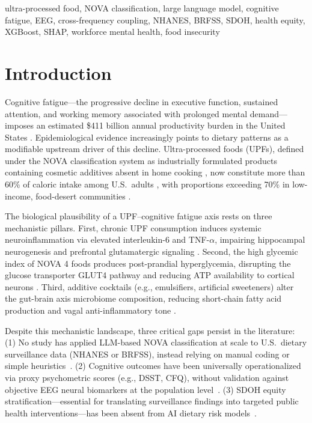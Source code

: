 \documentclass[journal]{IEEEtran}
\begin{document}
\begin{IEEEkeywords}
ultra-processed food, NOVA classification, large language model, cognitive
fatigue, EEG, cross-frequency coupling, NHANES, BRFSS, SDOH, health equity,
XGBoost, SHAP, workforce mental health, food insecurity
\end{IEEEkeywords}

\section{Introduction}
\label{sec:intro}

Cognitive fatigue—the progressive decline in executive function, sustained
attention, and working memory associated with prolonged mental demand—imposes
an estimated \$411 billion annual productivity burden in the United States
\cite{gallup2023}. Epidemiological evidence increasingly points to dietary
patterns as a modifiable upstream driver of this decline. Ultra-processed foods
(UPFs), defined under the NOVA classification system as industrially formulated
products containing cosmetic additives absent in home cooking \cite{monteiro2019},
now constitute more than 60\% of caloric intake among U.S.\ adults
\cite{martinez2021}, with proportions exceeding 70\% in low-income, food-desert
communities \cite{usda2019}.

The biological plausibility of a UPF--cognitive fatigue axis rests on three
mechanistic pillars. First, chronic UPF consumption induces systemic
neuroinflammation via elevated interleukin-6 and TNF-$\alpha$, impairing
hippocampal neurogenesis and prefrontal glutamatergic signaling \cite{jacka2017}.
Second, the high glycemic index of NOVA 4 foods produces post-prandial
hyperglycemia, disrupting the glucose transporter GLUT4 pathway and reducing
ATP availability to cortical neurons \cite{greenwood2019}. Third, additive
cocktails (e.g., emulsifiers, artificial sweeteners) alter the gut-brain axis
microbiome composition, reducing short-chain fatty acid production and vagal
anti-inflammatory tone \cite{zinoder2022}.

Despite this mechanistic landscape, three critical gaps persist in the
literature: (1) No study has applied LLM-based NOVA classification at scale
to U.S.\ dietary surveillance data (NHANES or BRFSS), instead relying on
manual coding or simple heuristics~\cite{steele2017,moubarac2018}.
(2) Cognitive outcomes have been universally operationalized via proxy
psychometric scores (e.g., DSST, CFQ), without validation against objective
EEG neural biomarkers at the population level~\cite{siervo2021,gomez2023}.
(3) SDOH equity stratification—essential for translating surveillance findings
into targeted public health interventions—has been absent from AI dietary risk
models~\cite{larson2019equity}.
\end{document}
